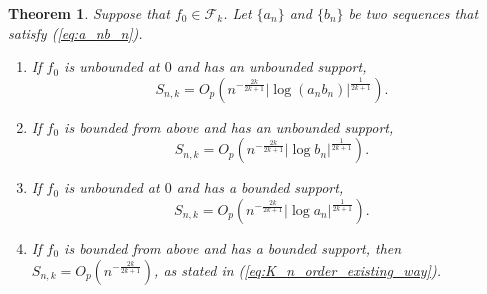 \documentclass[12pt,letterpaper, twoside, openany]{article}
\theoremstyle{plain}
\newtheorem{theorem}{Theorem}[section]
\begin{document}
	
	\begin{theorem}\label{thm:k_monotone_logLRT_rate}
		Suppose that $f_0 \in \mathcal{F}_k$. Let $\{a_n\}$ and $\{b_n\}$ be two sequences that satisfy  (\ref{eq:a_nb_n}).
		\begin{enumerate}%
			\item[(i)] If $f_0$ is unbounded at $0$ and has an unbounded support,
			\begin{equation*}
				S_{n,k} 
				= O_p\left(n^{-\frac{2k}{2k+1}} |\log (a_n b_n) |^{\frac{1}{2k+1}} \right).
			\end{equation*} 
			
			\item[(ii)] If $f_0$ is bounded from above and has an unbounded support,
			\begin{equation*}
				S_{n,k} 
				= O_p\left(n^{-\frac{2k}{2k+1}} |\log b_n |^{\frac{1}{2k+1}} \right).
			\end{equation*} 
			\item[(iii)] If $f_0$ is unbounded at $0$ and has a bounded support,
			\begin{equation*}
				S_{n,k} 
				= O_p\left(n^{-\frac{2k}{2k+1}} |\log a_n |^{\frac{1}{2k+1}} \right).
			\end{equation*} 
			
			\item[(iv)] If $f_0$ is bounded from above and has a bounded support, then $S_{n,k} = O_p\left(n^{-\frac{2k}{2k+1}}\right)$, as stated in (\ref{eq:K_n_order_existing_way}).
		\end{enumerate}
	\end{theorem}
	
\end{document}
